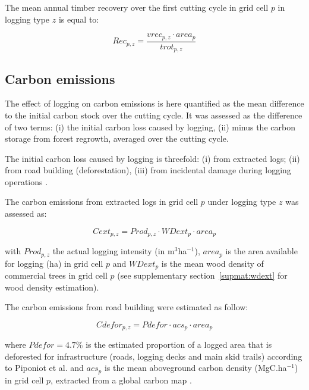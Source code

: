 \documentclass{article}
\begin{document}
The mean annual timber recovery over the first cutting cycle in grid cell $p$ in logging type $z$ is equal to: 

\begin{equation}
\label{eq:rec}
    Rec_{p,z} = \frac{vrec_{p,z}\cdot area_p}{trot_{p,z}}
\end{equation}

\subsection{Carbon emissions}

The effect of logging on carbon emissions is here quantified as the mean difference to the initial carbon stock over the cutting cycle. It was assessed as the difference of two terms: (i) the initial carbon loss caused by logging, (ii) minus the carbon storage from forest regrowth, averaged over the cutting cycle. 

The initial carbon loss caused by logging is threefold: (i) from extracted logs; (ii) from road building (deforestation), (iii) from incidental damage during logging operations \cite{Piponiot2016}. 

The carbon emissions from extracted logs in grid cell $p$ under logging type $z$ was assessed as: 

\begin{equation}
\label{eq:cext}
    Cext_{p,z} = Prod_{p,z} \cdot WDext_p \cdot  area_p
\end{equation}

with $Prod_{p,z}$ the actual logging intensity (in m$^3$ha$^{-1}$), $area_p$ is the area available for logging (ha) in grid cell $p$ and $WDext_p$ is the mean wood density of commercial trees in grid cell $p$ (see supplementary section~\ref{supmat:wdext} for wood density estimation). 

The carbon emissions from road building were estimated as follow: 

\begin{equation}
\label{eq:croad}
    Cdefor_{p,z} = Pdefor \cdot acs_p \cdot area_p
\end{equation}

where $Pdefor = 4.7 $\% is the estimated proportion of a logged area that is deforested for infrastructure (roads, logging decks and main skid trails) according to Piponiot et al. \cite{Piponiot2016} and $acs_p$ is the mean aboveground carbon density (MgC.ha$^{-1}$) in grid cell $p$, extracted from a global carbon map \cite{Avitabile2016}. 
\end{document}
